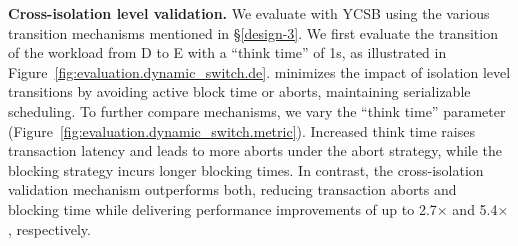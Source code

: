 \noindent\textbf{Cross-isolation level validation.} 
We evaluate \sysname with YCSB using the various transition mechanisms mentioned in \S\ref{design-3}. We first evaluate the transition of the workload from D to E with a ``think time'' of 1s, as illustrated in Figure~\ref{fig:evaluation.dynamic_switch.de}. \sysname minimizes the impact of isolation level transitions by avoiding active block time or aborts, maintaining serializable scheduling.
To further compare mechanisms, we vary the ``think time'' parameter (Figure~\ref{fig:evaluation.dynamic_switch.metric}). Increased think time raises transaction latency and leads to more aborts under the abort strategy, while the blocking strategy incurs longer blocking times. In contrast, the cross-isolation validation mechanism outperforms both, reducing transaction aborts and blocking time while delivering performance improvements of up to 2.7$\times$ and 5.4$\times$, respectively.


